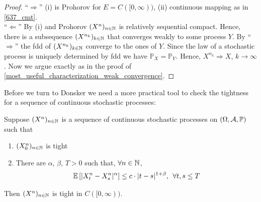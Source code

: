 \begin{proof}
	\enquote{$\Rightarrow$} (i) is Prohorov for $E = C([0,\infty))$, (ii) continuous mapping as in \ref{637_cmt}. \\
	\enquote{$\Leftarrow$} By (i) and Prohorov $(X^n)_{n\in\mathbb{N}}$ is relatively sequential compact. Hence, there is a subsequence $(X^{n_k})_{k\in\mathbb{N}}$ that converges weakly to some process $Y$. By \enquote{$\Rightarrow$} the fdd of $(X^{n_k})_{k\in\mathbb{N}}$ converge to the ones of $Y$. Since the law of a stochastic process is uniquely determined by fdd we have $\mathbb{P}_X = \mathbb{P}_Y$. Hence, $X^{n_k} \Rightarrow X$, $k\to\infty$. Now we argue exactly as in the proof of \ref{most_useful_characterization_weak_convergence}.
\end{proof}
Before we turn to Donsker we need a more practical tool to check the tightness for a sequence of continuous stochastic processes:
\begin{lsatz}
\begin{theorem}
	Suppose $(X^n)_{n\in\mathbb{N}}$ is a sequence of continuous stochastic processes on $(\Omega,\mathcal{A},\mathbb{P})$ such that
	\begin{enumerate}[label=(\roman*)]
		\item $(X_0^n)_{n\in\mathbb{N}}$ is tight
		\item There are $\alpha$, $\beta$, $T>0$ such that, $\forall n\in \mathbb{N}$, $$\mathbb{E}\left[\lvert X_t^n - X_s^n \rvert^{\alpha}\right] \leq c \cdot \lvert t - s \rvert^{1+\beta},\:\:\forall t,s \leq T$$
	\end{enumerate}
	Then $(X^n)_{n\in\mathbb{N}}$ is tight in $C([0,\infty))$.
\end{theorem}
\end{lsatz}
